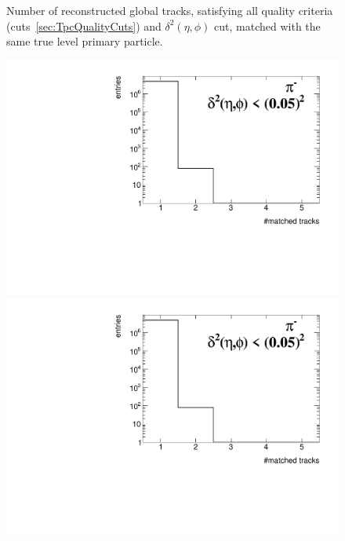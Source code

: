 \begin{figure}[ht]
{	}%
	\caption[Number of reconstructed global tracks, satisfying all quality criteria and $\delta^{2}\left(\eta,\phi\right)$ cut, matched with the same true level primary particle.]{Number of reconstructed global tracks, satisfying all quality criteria (cuts~\ref{sec:TpcQualityCuts}) and $\delta^{2}\left(\eta,\phi\right)$ cut, matched with the same true level primary particle.}\label{fig:trackSplittingetaPhi}
\end{figure}


\begin{figure}[h!]%
	\centering
	\parbox{0.329\textwidth}{
		\centering
		\includegraphics[width=\linewidth,page=21]{graphics/eff/trackSplitting_QualityEtaPhiCD.pdf}\\
		\includegraphics[width=\linewidth,page=24]{graphics/eff/trackSplitting_QualityEtaPhiCD.pdf}\\
}
\end{figure}
